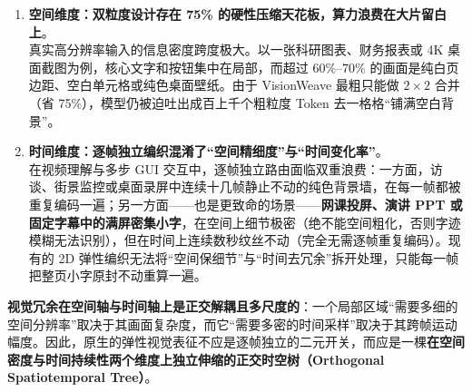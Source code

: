 \documentclass[11pt,a4paper]{ctexart}
\begin{document}
\begin{enumerate}[leftmargin=1.6em, itemsep=5pt]
  \item \textbf{空间维度：双粒度设计存在 75\% 的硬性压缩天花板，算力浪费在大片留白上}。\\
  真实高分辨率输入的信息密度跨度极大。以一张科研图表、财务报表或 4K 桌面截图为例，核心文字和按钮集中在局部，而超过 60\%--70\% 的画面是纯白页边距、空白单元格或纯色桌面壁纸。由于 VisionWeave 最粗只能做 $2{\times}2$ 合并（省 75\%），模型仍被迫吐出成百上千个粗粒度 Token 去一格格``铺满空白背景''。
  \item \textbf{时间维度：逐帧独立编织混淆了``空间精细度''与``时间变化率''}。\\
  在视频理解与多步 GUI 交互中，逐帧独立路由面临双重浪费：一方面，访谈、街景监控或桌面录屏中连续十几帧静止不动的纯色背景墙，在每一帧都被重复编码一遍；另一方面——也是更致命的场景——\textbf{网课投屏、演讲 PPT 或固定字幕中的满屏密集小字}，在空间上细节极密（绝不能空间粗化，否则字迹模糊无法识别），但在时间上连续数秒纹丝不动（完全无需逐帧重复编码）。现有的 2D 弹性编织无法将``空间保细节''与``时间去冗余''拆开处理，只能每一帧把整页小字原封不动重算一遍。
\end{enumerate}

\begin{insightbox}
\textbf{视觉冗余在空间轴与时间轴上是正交解耦且多尺度的}：一个局部区域``需要多细的空间分辨率''取决于其画面复杂度，而它``需要多密的时间采样''取决于其跨帧运动幅度。因此，原生的弹性视觉表征不应是逐帧独立的二元开关，而应是一棵\textbf{在空间密度与时间持续性两个维度上独立伸缩的正交时空树（Orthogonal Spatiotemporal Tree）}。
\end{insightbox}
\end{document}
